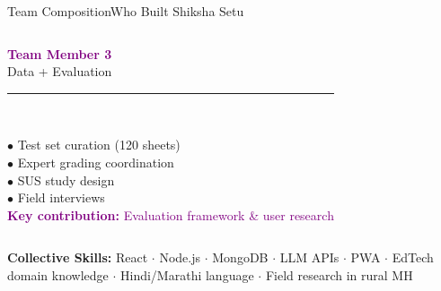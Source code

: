 \begin{frame}[t,shrink=5]{Team Composition}{Who Built Shiksha Setu}
\begin{columns}[T]
\vspace{4pt}
\colorbox{card}{\parbox{0.92\linewidth}{%
  \vspace{6pt}\centering
  \textcolor{purple}{\large\textbf{Team Member 3}}\\
  \textcolor{txtsec}{\scriptsize Data + Evaluation}\\[4pt]
  \textcolor{cardbdr}{\rule{0.8\linewidth}{0.3pt}}\\[4pt]
  \raggedright
  \textcolor{txtsec}{\scriptsize$\bullet$} \textcolor{txt}{\scriptsize Test set curation (120 sheets)}\\[2pt]
  \textcolor{txtsec}{\scriptsize$\bullet$} \textcolor{txt}{\scriptsize Expert grading coordination}\\[2pt]
  \textcolor{txtsec}{\scriptsize$\bullet$} \textcolor{txt}{\scriptsize SUS study design}\\[2pt]
  \textcolor{txtsec}{\scriptsize$\bullet$} \textcolor{txt}{\scriptsize Field interviews}\\[4pt]
  \textcolor{purple}{\scriptsize\textbf{Key contribution:} Evaluation framework \& user research}\\[6pt]
}}

\end{columns}

\vspace{6pt}
\colorbox{card}{\parbox{0.92\textwidth}{\centering\vspace{3pt}
  \textcolor{txtsec}{\scriptsize\textbf{Collective Skills:}}\;
  \textcolor{txt}{\scriptsize
    React $\cdot$ Node.js $\cdot$ MongoDB $\cdot$ LLM APIs $\cdot$ PWA $\cdot$
    EdTech domain knowledge $\cdot$ Hindi/Marathi language $\cdot$ Field research in rural MH}
\vspace{3pt}}}
\end{frame}


